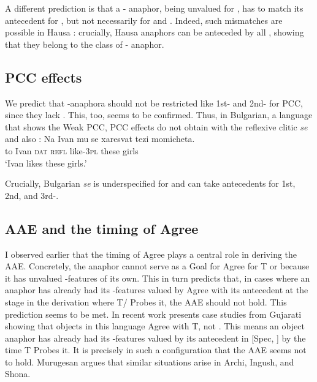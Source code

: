 \documentclass[output=paper, modfonts, nonflat]{langsci/langscibook}
\begin{document}
  A different prediction is that a \nul-\person{} anaphor, being
  unvalued for \person, has to match its antecedent for \person, but
  not necessarily for \num{} and \gender. Indeed, such \num{}
  mismatches are possible in Hausa \citep[42, 8]{haspelmath:2008}: crucially, Hausa anaphors can be anteceded by
  all \person{} \citep{Newman:2000}, showing that they belong to the
  class of \nul-\person{} anaphor.

     \subsection{PCC effects}
  
     We predict that \nul-anaphora should not be restricted like 1st-
     and 2nd-\person{} for PCC, since they lack \person. This, too,
     seems to be confirmed. Thus, in Bulgarian, a language that shows
     the Weak PCC, PCC effects do not obtain with the reflexive clitic
     \textit{se} \citep[][500]{rivero:2004} and also
     \citet{nevins:2007}:
     \ea \gll Na Ivan mu se xaresvat tezi momicheta.\\
     to Ivan \textsc{dat} \textsc{refl} like-\textsc{3pl} these
     girls\\
     \glt `Ivan likes these girls.'  \z

 \noindent  Crucially, Bulgarian \textit{se} is underspecified for \person{}
     and can take antecedents for 1st, 2nd, and 3rd-\person.


      \subsection{AAE and the timing of Agree}

      I observed earlier that the timing of Agree plays a central role
      in deriving the AAE. Concretely, the anaphor cannot serve as a
      Goal for Agree for T or \lilv{} because it has unvalued
      \ph-features of its own. This in turn predicts that, in cases
      where an anaphor has already had its \ph-features valued by
      Agree with its antecedent at the stage in the derivation where
      T/\lilv{} Probes it, the AAE should not hold. This prediction
      seems to be met. In recent work \citet{murugesan:2018} presents
      case studies from Gujarati showing that objects in this language
      Agree with T, not \lilv. This means an object anaphor has
      already had its \ph-features valued by its antecedent in [Spec,
      \lilv] by the time T Probes it. It is precisely in such a
      configuration that the AAE seems not to hold. Murugesan argues
      that similar situations arise in Archi, Ingush, and Shona.  
      
\end{document}
